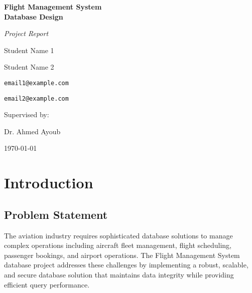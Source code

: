 \documentclass[a4paper,12pt]{article}
\begin{document}
\begin{titlepage}
    \centering
    \vspace*{2cm}
    {\Huge\bfseries Flight Management System\\ Database Design\par}
    \vspace{1.5cm}
    {\Large\itshape Project Report\par}
    \vspace{2cm}
    {\Large Student Name 1\par}
    {\Large Student Name 2\par}
    \vspace{1cm}
    {\large \texttt{email1@example.com}\par}
    {\large \texttt{email2@example.com}\par}
    \vspace{1.5cm}
    {\large Supervised by:\par}
    {\large Dr. Ahmed Ayoub\par}
    \vfill
    {\large \today\par}
\end{titlepage}

\pagestyle{fancy}
\fancyhf{}
\rfoot{\thepage}

\begin{abstract}
This document presents a comprehensive report on the Flight Management System database project, demonstrating advanced database design principles and implementation techniques. The system implements a fully normalized database schema with optimized query performance, robust security measures, and comprehensive data integrity controls. The project showcases practical application of database theory, including complex query optimization, transaction management, and security implementation in a real-world aviation management context.
\end{abstract}

\tableofcontents
\newpage

\pagestyle{fancy}
\fancyhf{}
\rfoot{\thepage}

\section{Introduction}
\subsection{Problem Statement}
The aviation industry requires sophisticated database solutions to manage complex operations including aircraft fleet management, flight scheduling, passenger bookings, and airport operations. The Flight Management System database project addresses these challenges by implementing a robust, scalable, and secure database solution that maintains data integrity while providing efficient query performance.
\end{document}
